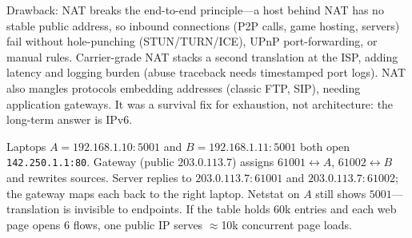 Drawback: NAT breaks the end-to-end principle---a host behind NAT has no stable public address, so inbound connections (P2P calls, game hosting, servers) fail without hole-punching (STUN/TURN/ICE), UPnP port-forwarding, or manual rules. Carrier-grade NAT stacks a second translation at the ISP, adding latency and logging burden (abuse traceback needs timestamped port logs). NAT also mangles protocols embedding addresses (classic FTP, SIP), needing application gateways. It was a survival fix for exhaustion, not architecture: the long-term answer is IPv6.
\begin{example}\label{ex:napt}
Laptops $A=192.168.1.10{:}5001$ and $B=192.168.1.11{:}5001$ both open \texttt{142.250.1.1:80}. Gateway (public $203.0.113.7$) assigns $61001 \leftrightarrow A$, $61002 \leftrightarrow B$ and rewrites sources. Server replies to $203.0.113.7{:}61001$ and $203.0.113.7{:}61002$; the gateway maps each back to the right laptop. Netstat on $A$ still shows $5001$---translation is invisible to endpoints. If the table holds 60k entries and each web page opens 6 flows, one public IP serves $\approx$10k concurrent page loads.
\end{example}
